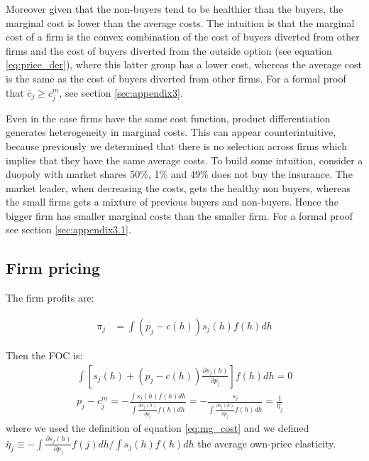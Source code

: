 \documentclass[12pt]{article}
\theoremstyle{plain}
\theoremstyle{plain}
\begin{document}
Moreover given that the non-buyers tend to be healthier than the buyers, the marginal cost is lower than the average costs. The intuition is that the marginal cost of a firm is the convex combination of the cost of buyers diverted from other firms and the cost of  buyers diverted from the outside option (see equation \ref{eq:price_der}), where this latter group has a lower cost, whereas the average cost is the same as the cost of buyers diverted from other firms.  For a formal proof that $ \bar{c}_j \geq c_j^m$, see section \ref{sec:appendix3}. 


Even in the case firms have the same cost function, product differentiation generates  heterogeneity in marginal costs. This can appear counterintuitive, because previously we determined that there is no selection across firms which implies that they have the same average costs. To build some intuition, consider a duopoly with market shares 50\%, 1\% and 49\% does not buy the insurance. The market leader, when decreasing the costs, gets the healthy non buyers, whereas the small firms gets a mixture of previous buyers and non-buyers. Hence the bigger firm has smaller marginal costs than the smaller firm. 
For a formal proof see section \ref{sec:appendix3.1}.

\subsection{Firm pricing}\label{sec:pricing}
The firm profits are:

\begin{align}
    \pi_j &= \int ( p_j -c(h) )s_j(h) f(h) dh  
\end{align}

Then the FOC is: 
\begin{align}\label{eq:FOC}
    \int \left[s_j(h)+ ( p_j -c(h) )\frac{\partial s_j(h)}{\partial p_j}\right] f(h) dh =0  \\
    p_j- c^m_j  = - \frac{\int s_j(h) f(h) dh}{\int  \frac{\partial s_j(h)}{\partial p_j} f(h) dh} = - \frac{ s_j}{\int  \frac{\partial s_j(h)}{\partial p_j} f(h) dh} = \frac{1}{\bar{\eta}_j}
\end{align}
where we used the definition of equation \ref{eq:mg_cost} and we defined $\bar{\eta}_j \equiv -\int \frac{\partial s_j(h)}{\partial p_j}f(j)dh / \int s_j(h) f(h)dh$  the average own-price elasticity. 
\end{document}

